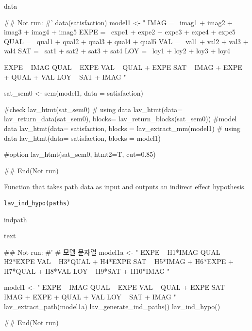 \documentclass[a4paper]{book}
\begin{document}
%
\begin{Value}
data
\end{Value}
%
\begin{Examples}
\begin{ExampleCode}

\#\# Not run: 
#'
data(satisfaction)
model1 <- "
IMAG =~ imag1 + imag2 + imag3 + imag4 + imag5
EXPE =~ expe1 + expe2 + expe3 + expe4 + expe5
QUAL =~ qual1 + qual2 + qual3 + qual4 + qual5
VAL =~ val1 + val2 + val3 + val4
SAT =~ sat1 + sat2 + sat3 + sat4
LOY =~ loy1 + loy2 + loy3 + loy4

EXPE ~ IMAG
QUAL ~ EXPE
VAL ~  QUAL + EXPE
SAT ~ IMAG + EXPE + QUAL + VAL
LOY ~ SAT + IMAG
"

sat_sem0 <- sem(model1, data = satisfaction)

#check
lav_htmt(sat_sem0)
# using data
lav_htmt(data= lav_return_data(sat_sem0), blocks= lav_return_blocks(sat_sem0))
#model data
lav_htmt(data= satisfaction, blocks =  lav_extract_mm(model1)%
# using data
lav_htmt(data= satisfaction, blocks = model1)

#option
lav_htmt(sat_sem0, htmt2=T, cut=0.85)



## End(Not run)

\end{ExampleCode}
\end{Examples}
%
\begin{Description}
Function that takes path data as input and outputs an indirect effect hypothesis.
\end{Description}
%
\begin{Usage}
\begin{verbatim}
lav_ind_hypo(paths)
\end{verbatim}
\end{Usage}
%
\begin{Arguments}
\begin{ldescription}
\item[\code{paths}] indpath
\end{ldescription}
\end{Arguments}
%
\begin{Value}
text
\end{Value}
%
\begin{Examples}
\begin{ExampleCode}

\#\# Not run: 
#'
# 모델 문자열
model1a <- "
EXPE ~ H1*IMAG
QUAL ~ H2*EXPE
VAL ~ H3*QUAL + H4*EXPE
SAT ~ H5*IMAG + H6*EXPE + H7*QUAL + H8*VAL
LOY ~ H9*SAT + H10*IMAG
"

model1 <- "
EXPE ~ IMAG
QUAL ~ EXPE
VAL ~ QUAL + EXPE
SAT ~ IMAG + EXPE + QUAL + VAL
LOY ~ SAT + IMAG
"
lav_extract_path(model1a)%
  lav_generate_ind_paths() %
  lav_ind_hypo()


## End(Not run)

\end{ExampleCode}
\end{Examples}
\end{document}
